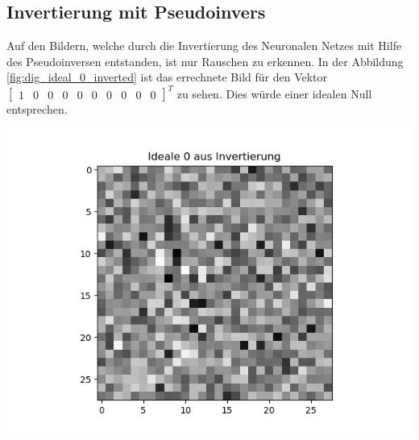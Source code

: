 \documentclass[Interploate_hadwritten_Digits.tex]{subfiles}
\begin{document}
	\subsection{Invertierung mit Pseudoinvers}
	Auf den Bildern, welche durch die Invertierung des Neuronalen Netzes mit Hilfe des Pseudoinversen entstanden, ist nur Rauschen zu erkennen. In der Abbildung \ref{fig:dig_ideal_0_inverted} ist das errechnete Bild für den Vektor $ \begin{bmatrix}1 & 0 & 0 & 0 & 0 & 0 & 0 & 0 & 0 & 0 \end{bmatrix}^{T} $ zu sehen. Dies würde einer idealen Null entsprechen.
	\begin{Figure}
		\centering
		\includegraphics[width=\linewidth]{img/results/ideal_0_inverted.png}
		\label{fig:dig_ideal_0_inverted}
	\end{Figure}
\end{document}
